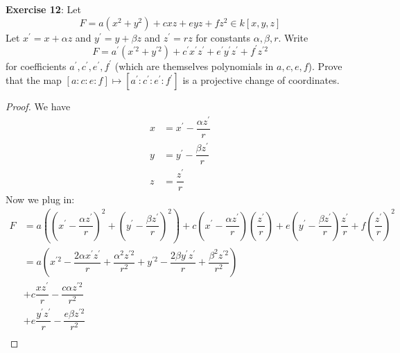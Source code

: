 \documentclass{article}
\begin{document}
\textbf{Exercise 12}: Let 
    \begin{equation*}
        F = a(x^{2} + y^{2}) + cxz + eyz + fz^{2} \in k[x, y, z]
    \end{equation*}
Let $x^{\prime} = x + \alpha z$ and $y^{\prime} = y + \beta z$ and $z^{\prime} = rz$ for constants $\alpha, \beta, r$. Write
    \begin{equation*}
        F = a^{\prime}(x^{\prime2} + y^{\prime2}) + c^{\prime}x^{\prime}z^{\prime} + e^{\prime}y^{\prime}z^{\prime} + f^{\prime}z^{\prime2}
    \end{equation*}
for coefficients $a^{\prime}, c^{\prime}, e^{\prime}, f^{\prime}$ (which are themselves polynomials in $a, c, e, f$). Prove that the map $[a : c : e : f] \mapsto [a^{\prime} : c^{\prime} : e^{\prime} : f^{\prime}]$ is a projective change of coordinates.
    \begin{proof}
        We have 
            \begin{align*}
                x &= x^{\prime} - \dfrac{\alpha z^{\prime}}{r} \\
                y &= y^{\prime} - \dfrac{\beta z^{\prime}}{r}  \\
                z &= \dfrac{z^{\prime}}{r}                       
            \end{align*}
        Now we plug in:
            \begin{align*}
                F &= a((x^{\prime} - \dfrac{\alpha z^{\prime}}{r})^{2} + (y^{\prime} - \dfrac{\beta z^{\prime}}{r})^{2}) + c(x^{\prime} - \dfrac{\alpha z^{\prime}}{r})(\dfrac{z^{\prime}}{r}) + e(y^{\prime} - \dfrac{\beta z^{\prime}}{r})\dfrac{z^{\prime}}{r} + f(\dfrac{z^{\prime}}{r})^{2}             \\
                  &= a(x^{\prime2} - \dfrac{2\alpha x^{\prime}z^{\prime}}{r} + \dfrac{\alpha^{2}z^{\prime2}}{r^{2}} + y^{\prime2} - \dfrac{2\beta y^{\prime}z^{\prime}}{r} + \dfrac{\beta^{2}z^{\prime2}}{r^{2}})                                                                                            \\
                  &  +c\dfrac{xz^{\prime}}{r} - \dfrac{c\alpha z^{\prime2}}{r^{2}}                                                                                                                                                                                                                           \\
                  &  + e\dfrac{y^{\prime} z^{\prime}}{r} - \dfrac{e \beta z^{\prime2}}{r^{2}}                                                                                                                                                                                                                \\

\end{align*}
\end{proof}
\end{document}
